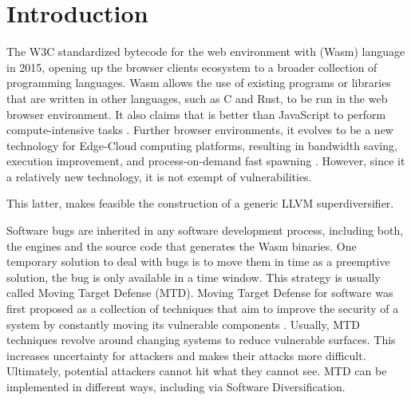 \chapter{Introduction}
\label{chapter:intro}





The W3C standardized bytecode for the web environment with \wasm (Wasm) language in 2015, opening up the browser clients ecosystem to a broader collection of programming languages. Wasm allows the use of existing programs or libraries that are written in other languages, such as C and Rust, to be run in the web browser environment. It also claims that is better than JavaScript to perform compute-intensive tasks \cite{Haas_2017}. 
Further browser environments, it evolves to be a new technology for Edge-Cloud computing platforms, resulting in bandwidth saving, execution improvement, and process-on-demand fast spawning \cite{9640153, wen2020wasmachine}. However, since it a relatively new technology, it is not exempt of vulnerabilities.

This latter, makes feasible the construction of a generic LLVM superdiversifier. 

Software bugs are inherited in any software development process, including both, the \wasm engines and the source code that generates the Wasm binaries. One temporary solution to deal with bugs is to move them in time as a preemptive solution, the bug is only available in a time window. This strategy is usually called Moving Target Defense (MTD). Moving Target Defense for software was first proposed as a collection of techniques that aim to improve the security of a system by constantly moving its vulnerable components \cite{MTDNationalCyberLaep, okhravi2013survey}. Usually, MTD techniques revolve around changing systems to reduce vulnerable surfaces. This increases uncertainty for attackers and makes their attacks more difficult. Ultimately, potential attackers cannot hit what they cannot see. MTD can be implemented in different ways, including via Software Diversification. 

